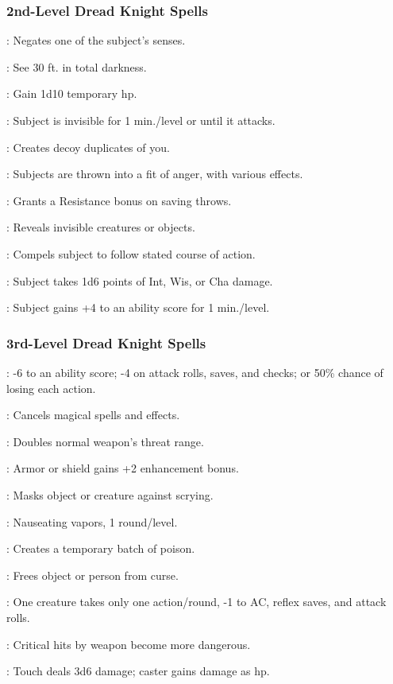 \subsubsection{2nd-Level Dread Knight Spells}
\begin{list}{}{\leftmargin=1em}
\item {}: Negates one of the subject's senses.
\item {}: See 30 ft. in total darkness.
\item {}: Gain 1d10 temporary hp.
\item {}: Subject is invisible for 1 min./level or until it attacks.
\item {}: Creates decoy duplicates of you.
\item {}: Subjects are thrown into a fit of anger, with various effects.
\item {}: Grants a Resistance bonus on saving throws.
\item {}: Reveals invisible creatures or objects.
\item {}: Compels subject to follow stated course of action.
\item {}: Subject takes 1d6 points of Int, Wis, or Cha damage.
\item {}: Subject gains +4 to an ability score for 1 min./level.
\end{list}
\subsubsection{3rd-Level Dread Knight Spells}
\begin{list}{}{\leftmargin=1em}
\item {}: -6 to an ability score; -4 on attack rolls, saves, and checks; or 50\% chance of losing each action.
\item {}: Cancels magical spells and effects.
\item {}: Doubles normal weapon's threat range.
\item {}: Armor or shield gains +2 enhancement bonus.
\item {}: Masks object or creature against scrying.
\item {}: Nauseating vapors, 1 round/level.
\item {}: Creates a temporary batch of poison.
\item {}: Frees object or person from curse.
\item {}: One creature takes only one action/round, -1 to AC, reflex saves, and attack rolls.
\item {}: Critical hits by weapon become more dangerous.
\item {}: Touch deals 3d6 damage; caster gains damage as hp.
\end{list}
